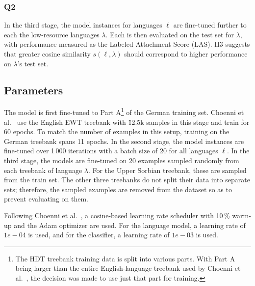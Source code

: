 		\subsubsection{Q2}
		In the third stage, the model instances for languages $\ell$ are fine-tuned further to each the low-resource languages $\lambda$. Each \m{\ell}{\lambda} is then evaluated on the test set for $\lambda$, with performance measured as the Labeled Attachment Score (LAS). H3 suggests that greater cosine similarity $s(\ell, \lambda)$ should correspond to higher performance on $\lambda$'s test set.

	\subsection{Parameters}
	\label{sub:parameters}
		The model is first fine-tuned to Part A\footnote{The HDT treebank training data is split into various parts. With Part A being larger than the entire English-language treebank used by Choenni et al.~\cite{choenni-etal-2023-cross}, the decision was made to use just that part for training.} of the German training set. Choenni et al.~\cite{choenni-etal-2023-cross} use the English EWT treebank with \~12.5k samples in this stage and train for 60 epochs. To match the number of examples in this setup, training on the German treebank spans 11 epochs. In the second stage, the model instances are fine-tuned over 1\,000 iterations with a batch size of 20 for all languages $\ell$. In the third stage, the models are fine-tuned on 20 examples sampled randomly from each treebank of language $\lambda$. For the Upper Sorbian treebank, these are sampled from the train set. The other three treebanks do not split their data into separate sets; therefore, the sampled examples are removed from the dataset so as to prevent evaluating on them. 

		Following Choenni et al.~\cite{choenni-etal-2023-cross}, a cosine-based learning rate scheduler with 10\,\% warm-up and the Adam optimizer are used. For the language model, a learning rate of $1e-04$ is used, and for the classifier, a learning rate of $1e-03$ is used.

